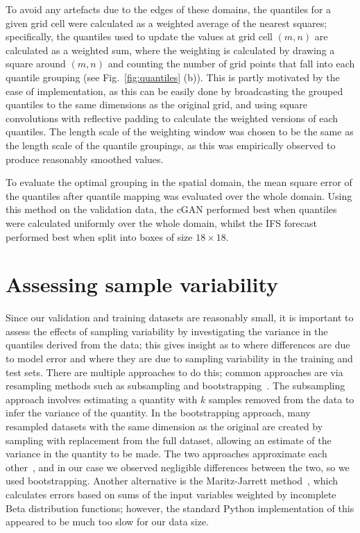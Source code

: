 \documentclass[../main.tex]{subfiles}
\begin{document}
To avoid any artefacts due to the edges of these domains, the quantiles for a given grid cell were calculated as a weighted average of the nearest squares; specifically, the quantiles used to update the values at grid cell $(m,n)$ are calculated as a weighted sum, where the weighting is calculated by drawing a square around $(m,n)$ and counting the number of grid points that fall into each quantile grouping (see Fig.~\ref{fig:quantiles} (b)). This is partly motivated by the ease of implementation, as this can be easily done by broadcasting the grouped quantiles to the same dimensions as the original grid, and using square convolutions with reflective padding to calculate the weighted versions of each quantiles. The length scale of the weighting window was chosen to be the same as the length scale of the quantile groupings, as this was empirically observed to produce reasonably smoothed values.

To evaluate the optimal grouping in the spatial domain, the mean square error of the quantiles after quantile mapping was evaluated over the whole domain. Using this method on the validation data, the cGAN performed best when quantiles were calculated uniformly over the whole domain, whilst the IFS forecast performed best when split into boxes of size $18 \times 18$. 


 
\section{Assessing sample variability}
\label{sec:sample_var}
Since our validation and training datasets are reasonably small, it is important to assess the effects of sampling variability by investigating the variance in the quantiles derived from the data; this gives insight as to where differences are due to model error and where they are due to sampling variability in the training and test sets. There are multiple approaches to do this; common approaches are via resampling methods such as subsampling and bootstrapping~\citep{efron_6_1982}. The subsampling approach involves estimating a quantity with $k$ samples removed from the data to infer the variance of the quantity. In the bootstrapping approach, many resampled datasets with the same dimension as the original are created by sampling with replacement from the full dataset, allowing an estimate of the variance in the quantity to be made. The two approaches approximate each other~\citep{efron_6_1982}, and in our case we observed negligible differences between the two, so we used bootstrapping. Another alternative is the Maritz-Jarrett method~\citep{wilcox_chapter_2022}, which calculates errors based on sums of the input variables weighted by incomplete Beta distribution functions; however, the standard Python implementation of this appeared to be much too slow for our data size.





     
\ifSubfilesClassLoaded{%
    
    

}{}
\end{document}
